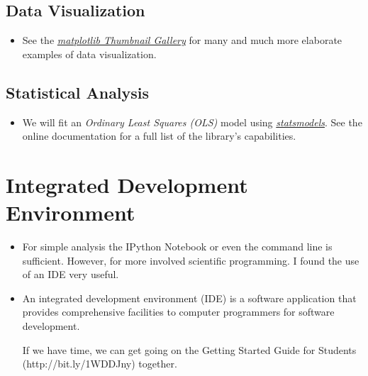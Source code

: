 \documentclass[a4paper,12pt,bold,leqno,fleqn,]{scrartcl}
\begin{document}
\subsection{Data Visualization }
\begin{itemize}
\item See the \href{http://matplotlib.org/gallery.html}{\textit{matplotlib Thumbnail Gallery}} for many and much more elaborate examples of data visualization.
\end{itemize}
\subsection{Statistical Analysis}
\begin{itemize}
\item We will fit an \textit{Ordinary Least Squares (OLS)} model using \href{http://statsmodels.sourceforge.net}{\textit{statsmodels}}. See the online documentation for a full list of the library's capabilities.
\end{itemize}
\section{Integrated Development Environment}
\begin{itemize}
\item For simple analysis the IPython Notebook or even the command line is sufficient. However, for more involved scientific programming. I found the use of an IDE very useful.
\item An integrated development environment (IDE) is a software application that provides comprehensive facilities to computer programmers for software development.

If we have time, we can get going on the Getting Started Guide for Students (http://bit.ly/1WDDJny) together. 
\end{itemize}




\end{document}
